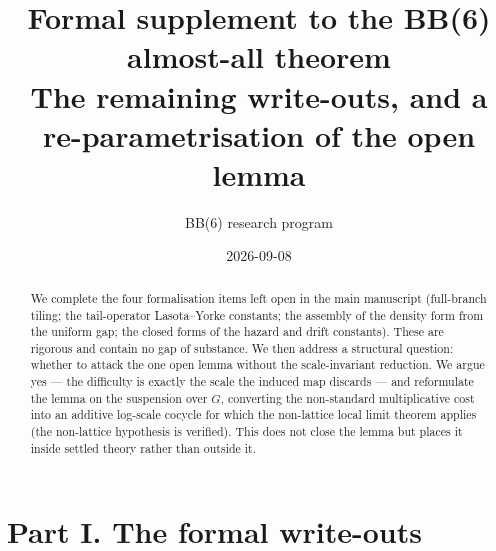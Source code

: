 \documentclass[11pt]{article}
\title{\bfseries Formal supplement to the BB(6) almost-all theorem\\[2pt]
\large The remaining write-outs, and a re-parametrisation of the open lemma}
\author{BB(6) research program}\date{2026-09-08}
\theoremstyle{remark}\newtheorem{remark}{Remark}
\begin{document}
\maketitle
\begin{abstract}
We complete the four formalisation items left open in the main manuscript
(full-branch tiling; the tail-operator Lasota--Yorke constants; the assembly
of the density form from the uniform gap; the closed forms of the hazard and
drift constants). These are rigorous and contain no gap of substance. We then
address a structural question: whether to attack the one open lemma without
the scale-invariant reduction. We argue yes --- the difficulty is exactly the
scale the induced map discards --- and reformulate the lemma on the suspension
over $G$, converting the non-standard multiplicative cost into an additive
log-scale cocycle for which the non-lattice local limit theorem applies (the
non-lattice hypothesis is verified). This does not close the lemma but places
it inside settled theory rather than outside it.
\end{abstract}

\section*{Part I. The formal write-outs}
\end{document}
